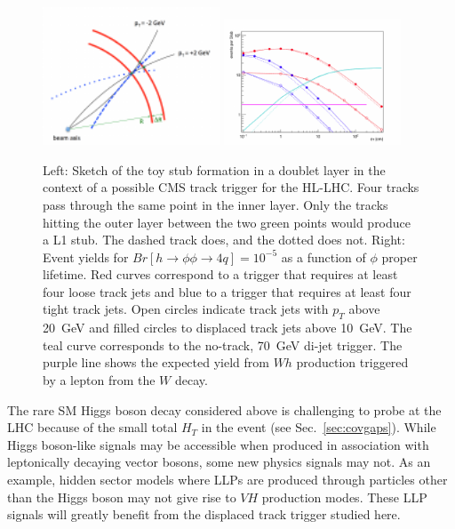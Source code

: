 \begin{figure}[t]\begin{center}
\includegraphics[width=0.47\textwidth]{figures/L1TT/geom.pdf}
\includegraphics[width=0.47\textwidth]{figures/L1TT/final_h125.pdf}
\caption{Left: Sketch of the toy stub formation in a doublet layer in the context of a possible CMS track trigger for the HL-LHC. Four tracks pass through the same point in the inner layer. Only the tracks hitting the outer layer between the two green points would produce a L1 stub. The dashed track does, and the dotted does not. Right: Event yields for $Br[h\rightarrow\phi\phi\rightarrow 4q]=10^{-5}$ as a function of $\phi$ proper lifetime. Red curves correspond to a trigger that requires at least four loose track jets and blue to a trigger that requires at least four tight track jets. Open circles indicate track jets with $p_T$ above 20~GeV and filled circles to displaced track jets above 10~GeV. The teal curve corresponds to the no-track, 70~GeV di-jet trigger. The purple line shows the expected yield from $Wh$ production triggered by a lepton from the $W$ decay.}
\label{fig:tracktrigger_toy}
\end{center}
\end{figure}

The rare SM Higgs boson decay considered above is challenging to probe at the LHC because of the small total $H_T$ in the event (see Sec.~\ref{sec:covgaps}). While Higgs boson-like signals may be accessible when produced in association with leptonically decaying vector bosons, some new physics signals may not. As an example, hidden sector models where LLPs are produced through particles other than the Higgs boson may not give rise to $VH$ production modes. These LLP signals will greatly benefit from the displaced track trigger studied here.

